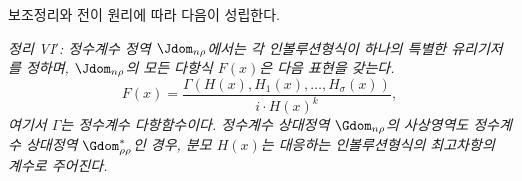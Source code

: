 
보조정리와 전이 원리에 따라 다음이 성립한다.

\emph{정리 VI$'$: 정수계수 정역 $\Jdom_{n\rho}$에서는 각 인볼루션형식이 하나의 특별한 유리기저를 정하며, $\Jdom_{n\rho}$의 모든 다항식 $F(x)$은 다음 표현을 갖는다.}
\[
  F(x)=\frac{\Gamma(H(x),H_1(x),\ldots,H_\sigma(x))}{i\cdot H(x)^k},
\]
\emph{여기서 $\Gamma$는 정수계수 다항함수이다. 정수계수 상대정역 $\Gdom_{n\rho}$의 사상영역도 정수계수 상대정역 $\Gdom^*_{\rho\rho}$인 경우, 분모 $H(x)$는 대응하는 인볼루션형식의 최고차항의 계수로 주어진다.}
